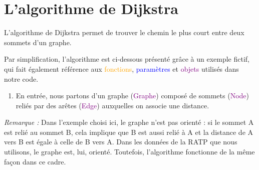 \documentclass[,french]{article}
\providecommand{\tightlist}{%
  \setlength{\itemsep}{0pt}\setlength{\parskip}{0pt}}
\begin{document}
\hypertarget{sec:algo}{%
\section{L'algorithme de Dijkstra}\label{sec:algo}}

L'algorithme de Dijkstra permet de trouver le chemin le plus court entre
deux sommets d'un graphe.

Par simplification, l'algorithme est ci-dessous présenté grâce à un
exemple fictif, qui fait également référence aux
\textcolor{orange}{fonctions}, \textcolor{blue}{paramètres} et
\textcolor{purple}{objets} utilisés dans notre code.

\begin{enumerate}
\def\labelenumi{\arabic{enumi}.}
\tightlist
\item
  En entrée, nous partons d'un graphe (\textcolor{purple}{Graphe})
  composé de sommets (\textcolor{purple}{Node}) reliés par des arêtes
  (\textcolor{purple}{Edge}) auxquelles on associe une distance.
\end{enumerate}

\begin{center}
\end{center}

\emph{Remarque :} Dans l'exemple choisi ici, le graphe n'est pas orienté
: si le sommet A est relié au sommet B, cela implique que B est aussi
relié à A et la distance de A vers B est égale à celle de B vers A. Dans
les données de la RATP que nous utilisons, le graphe est, lui, orienté.
Toutefois, l'algorithme fonctionne de la même façon dans ce cadre.
\end{document}
